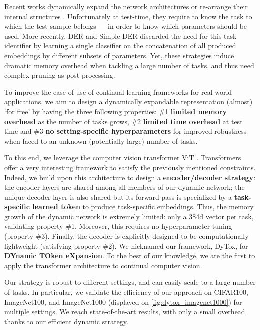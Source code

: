 Recent works
\citep{yoon2018dynamically_expandable_networks,li2019learning_to_grow,hung2019cpg,fernando2017path_net,golkar2019neural_pruning,serra2018hat}
dynamically expand the network architectures
\citep{yoon2018dynamically_expandable_networks,li2019learning_to_grow} or re-arrange their internal
structures \citep{fernando2017path_net,serra2018hat,hung2019cpg,golkar2019neural_pruning}.
Unfortunately at test-time, they require to know the task to which the test sample belongs --- in
order to know which parameters should be used. More recently, DER \citep{yan2021der} and Simple-DER
\citep{li2021preserve} discarded the need for this task identifier by learning a single classifier on
the concatenation of all produced embeddings by different subsets of parameters. Yet, these
strategies induce dramatic memory overhead when tackling a large number of tasks, and thus need
complex pruning as post-processing.

To improve the ease of use of continual learning frameworks for real-world applications, we aim to
design a dynamically expandable representation (almost) `for free' by having the three following
properties: \#1 \textbf{limited memory overhead} as the number of tasks grows, \#2 \textbf{limited
    time overhead} at test time and \#3 \textbf{no setting-specific hyperparameters} for improved
robustness when faced to an unknown (potentially large) number of tasks.

To this end, we leverage the computer vision transformer ViT \citep{dosovitskiy2020vit}. Transformers
\citep{vaswani2017transformer} offer a very interesting framework to satisfy the previously
mentioned constraints. Indeed, we build upon this architecture to design a \textbf{encoder/decoder
    strategy}: the encoder layers are shared among all members of our dynamic network; the unique
decoder layer is also shared but its forward pass is specialized by a \textbf{task-specific learned
    token} to produce task-specific embeddings. Thus, the memory growth of the dynamic network is
extremely limited: only a 384d vector per task, validating property \#1. Moreover, this requires no
hyperparameter tuning (property \#3). Finally, the decoder is explicitly designed to be
computationally lightweight (satisfying property \#2). We nicknamed our framework, DyTox, for
\textbf{DYnamic TOken eXpansion}. To the best of our knowledge, we are the first to apply the
transformer architecture to continual computer vision.

Our strategy is robust to different settings, and can easily scale to a large number of tasks. In
particular, we validate the efficiency of our approach on CIFAR100, ImageNet100, and ImageNet1000
(displayed on \autoref{fig:dytox_imagenet1000}) for multiple settings. We reach state-of-the-art results,
with only a small overhead thanks to our efficient dynamic strategy.

